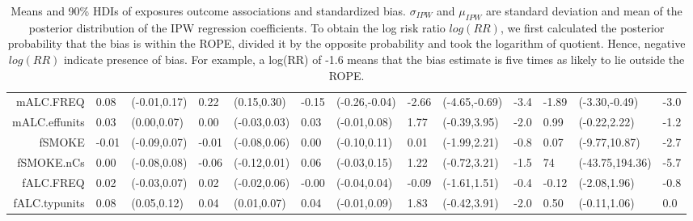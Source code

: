\begin{sidewaystable}
{\begin{tabular}{rLlLlLlLlLLlL}
  mALC.FREQ & 0.08 & (-0.01,0.17) & 0.22 & (0.15,0.30) & -0.15 & (-0.26,-0.04) & -2.66 & (-4.65,-0.69) & -3.4 & -1.89 & (-3.30,-0.49) & -3.0 \\ 
  mALC.effunits & 0.03 & (0.00,0.07) & 0.00 & (-0.03,0.03) & 0.03 & (-0.01,0.08) & 1.77 & (-0.39,3.95) & -2.0 & 0.99 & (-0.22,2.22) & -1.2 \\ 
  fSMOKE & -0.01 & (-0.09,0.07) & -0.01 & (-0.08,0.06) & 0.00 & (-0.10,0.11) & 0.01 & (-1.99,2.21) & -0.8 & 0.07 & (-9.77,10.87) & -2.7 \\ 
  fSMOKE.nCs & 0.00 & (-0.08,0.08) & -0.06 & (-0.12,0.01) & 0.06 & (-0.03,0.15) & 1.22 & (-0.72,3.21) & -1.5 & 74 & (-43.75,194.36) & -5.7 \\ 
  fALC.FREQ & 0.02 & (-0.03,0.07) & 0.02 & (-0.02,0.06) & -0.00 & (-0.04,0.04) & -0.09 & (-1.61,1.51) & -0.4 & -0.12 & (-2.08,1.96) & -0.8 \\ 
  fALC.typunits & 0.08 & (0.05,0.12) & 0.04 & (0.01,0.07) & 0.04 & (-0.01,0.09) & 1.83 & (-0.42,3.91) & -2.0 & 0.50 & (-0.11,1.06) & 0.0 \\ 
   \hline
\end{tabular}}
\caption{Means and 90\% HDIs of exposures outcome associations and standardized bias. $\sigma_{IPW}$ and $\mu_{IPW}$ are standard deviation and mean of the posterior distribution of the IPW regression coefficients. To obtain the log risk ratio $log(RR)$, we first calculated the posterior probability that the bias is within the ROPE, divided it by the opposite probability and took the logarithm of quotient. Hence, negative $log(RR)$ indicate presence of bias. For example, a log(RR) of -1.6 means that the bias estimate is five times as likely to lie outside the ROPE.} 
\label{table:estimates}
\end{sidewaystable}